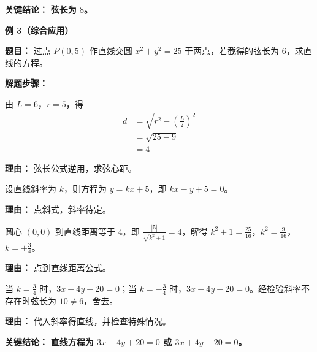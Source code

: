 \begin{examplebox}
	\textbf{\textcolor{CExample}{关键结论：}}
	\textbf{弦长为 $8$。}

	\medskip
	\textbf{\textcolor{CExample}{例 3（综合应用）}}

	\textbf{\textcolor{CExample}{题目：}}
	过点 $P(0,5)$ 作直线交圆 $x^{2}+y^{2}=25$ 于两点，若截得的弦长为 $6$，求直线的方程。

	\textbf{\textcolor{CExample}{解题步骤：}}
	\begin{description}[style=nextline, leftmargin=2.8em, labelsep=0.5em, itemsep=0.45em]
		\item[\textbf{第一步（反求弦心距）：}] 由 $L=6$，$r=5$，得
			\[
				\begin{aligned}
					d &= \sqrt{r^{2}-\left(\frac{L}{2}\right)^{2}} \\
					&= \sqrt{25-9} \\
					&= 4
			\end{aligned}
			\]
			\par\textbf{理由：} 弦长公式逆用，求弦心距。
		\item[\textbf{第二步（设直线方程）：}] 设直线斜率为 $k$，则方程为 $y=kx+5$，即 $kx-y+5=0$。
			\par\textbf{理由：} 点斜式，斜率待定。
		\item[\textbf{第三步（由距离求斜率）：}] 圆心 $(0,0)$ 到直线距离等于 $4$，即 $\frac{|5|}{\sqrt{k^{2}+1}}=4$，解得 $k^{2}+1=\frac{25}{16}$，$k^{2}=\frac{9}{16}$，$k=\pm\frac{3}{4}$。
			\par\textbf{理由：} 点到直线距离公式。
		\item[\textbf{第四步（写出方程并检验）：}] 当 $k=\frac{3}{4}$ 时，$3x-4y+20=0$；当 $k=-\frac{3}{4}$ 时，$3x+4y-20=0$。经检验斜率不存在时弦长为 $10\neq6$，舍去。
			\par\textbf{理由：} 代入斜率得直线，并检查特殊情况。
	\end{description}

	\textbf{\textcolor{CExample}{关键结论：}}
	\textbf{直线方程为 $3x-4y+20=0$ 或 $3x+4y-20=0$。}
\end{examplebox}
